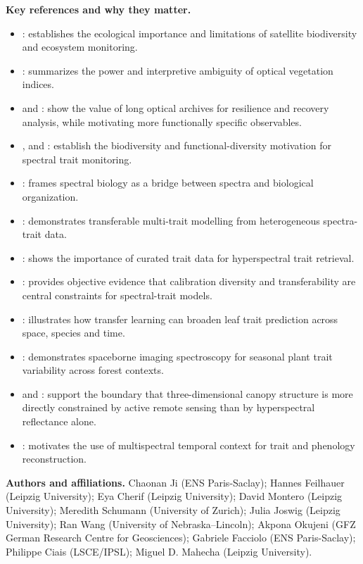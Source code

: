 \documentclass[11pt]{article}
\begin{document}
\textbf{Key references and why they matter.}
\begin{itemize}
\item \citet{pettorelli2018satellite}: establishes the ecological importance and limitations of satellite biodiversity and ecosystem monitoring.
\item \citet{zeng2022optical}: summarizes the power and interpretive ambiguity of optical vegetation indices.
\item \citet{smith2022resilience} and \citet{yan2025forestrecovery}: show the value of long optical archives for resilience and recovery analysis, while motivating more functionally specific observables.
\item \citet{jetz2016monitoring}, \citet{Schweiger2018} and \citet{schweiger2022beta}: establish the biodiversity and functional-diversity motivation for spectral trait monitoring.
\item \citet{cavender2025spectral}: frames spectral biology as a bridge between spectra and biological organization.
\item \citet{cherif2023spectra}: demonstrates transferable multi-trait modelling from heterogeneous spectra-trait data.
\item \citet{mederer2025plant}: shows the importance of curated trait data for hyperspectral trait retrieval.
\item \citet{ji2024transferability}: provides objective evidence that calibration diversity and transferability are central constraints for spectral-trait models.
\item \citet{ji2025transferlearning}: illustrates how transfer learning can broaden leaf trait prediction across space, species and time.
\item \citet{ji2025prisma}: demonstrates spaceborne imaging spectroscopy for seasonal plant trait variability across forest contexts.
\item \citet{dubayah2024structural} and \citet{lang2024gedi}: support the boundary that three-dimensional canopy structure is more directly constrained by active remote sensing than by hyperspectral reflectance alone.
\item \citet{liu2024spectraphenology}: motivates the use of multispectral temporal context for trait and phenology reconstruction.
\end{itemize}

\textbf{Authors and affiliations.}
Chaonan Ji (ENS Paris-Saclay);
Hannes Feilhauer (Leipzig University);
Eya Cherif (Leipzig University);
David Montero (Leipzig University);
Meredith Schumann (University of Zurich);
Julia Joswig (Leipzig University);
Ran Wang (University of Nebraska--Lincoln);
Akpona Okujeni (GFZ German Research Centre for Geosciences);
Gabriele Facciolo (ENS Paris-Saclay);
Philippe Ciais (LSCE/IPSL);
Miguel D. Mahecha (Leipzig University).



\end{document}
